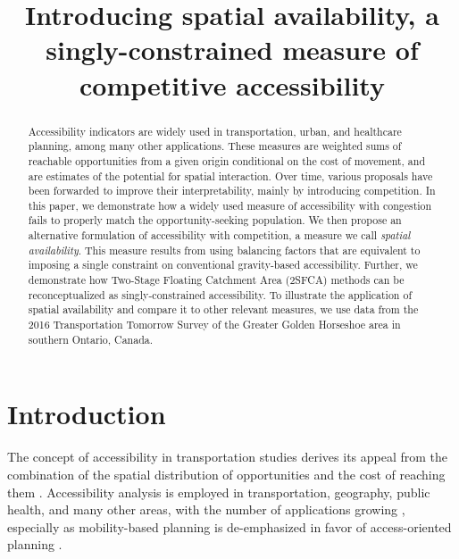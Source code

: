 \documentclass[]{elsarticle} %
\begin{document}
\begin{frontmatter}

  \title{Introducing spatial availability, a singly-constrained measure
of competitive accessibility}
  
  \begin{abstract}
  Accessibility indicators are widely used in transportation, urban, and
  healthcare planning, among many other applications. These measures are
  weighted sums of reachable opportunities from a given origin
  conditional on the cost of movement, and are estimates of the
  potential for spatial interaction. Over time, various proposals have
  been forwarded to improve their interpretability, mainly by
  introducing competition. In this paper, we demonstrate how a widely
  used measure of accessibility with congestion fails to properly match
  the opportunity-seeking population. We then propose an alternative
  formulation of accessibility with competition, a measure we call
  \emph{spatial availability}. This measure results from using balancing
  factors that are equivalent to imposing a single constraint on
  conventional gravity-based accessibility. Further, we demonstrate how
  Two-Stage Floating Catchment Area (2SFCA) methods can be
  reconceptualized as singly-constrained accessibility. To illustrate
  the application of spatial availability and compare it to other
  relevant measures, we use data from the 2016 Transportation Tomorrow
  Survey of the Greater Golden Horseshoe area in southern Ontario,
  Canada.
  \end{abstract}
  
 \end{frontmatter}

\newpage

\hypertarget{sec:introduction}{%
\section{Introduction}\label{sec:introduction}}

The concept of accessibility in transportation studies derives its
appeal from the combination of the spatial distribution of opportunities
and the cost of reaching them \citep{hansen1959, handy_measuring_1997}.
Accessibility analysis is employed in transportation, geography, public
health, and many other areas, with the number of applications growing
\citep{shi_literature_2020}, especially as mobility-based planning is
de-emphasized in favor of access-oriented planning
\citep{deboosere2018, handy2020, proffitt2017, yan2021}.
\end{document}
